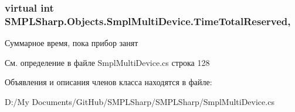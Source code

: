 \hypertarget{class_s_m_p_l_sharp_1_1_objects_1_1_smpl_multi_device_a1d6b0142376d56ac7e2dc9bd977fe338}{
\subsubsection[{Time\-Total\-Reserved}]{\setlength{\rightskip}{0pt plus 5cm}virtual int S\-M\-P\-L\-Sharp.\-Objects.\-Smpl\-Multi\-Device.\-Time\-Total\-Reserved\hspace{0.3cm}{\ttfamily [get]}, {\ttfamily [set]}}}\label{d8/d23/class_s_m_p_l_sharp_1_1_objects_1_1_smpl_multi_device_a1d6b0142376d56ac7e2dc9bd977fe338}


Суммарное время, пока прибор занят 



См. определение в файле Smpl\-Multi\-Device.\-cs строка 128



Объявления и описания членов класса находятся в файле\-:\begin{DoxyCompactItemize}
\item 
D\-:/\-My Documents/\-Git\-Hub/\-S\-M\-P\-L\-Sharp/\-S\-M\-P\-L\-Sharp/Smpl\-Multi\-Device.\-cs\end{DoxyCompactItemize}
